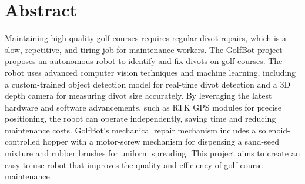 \chapter*{Abstract}
Maintaining high-quality golf courses requires regular divot repairs, which is a slow, repetitive, and tiring job for maintenance workers. The GolfBot project proposes an autonomous robot to identify and fix divots on golf courses. The robot uses advanced computer vision techniques and machine learning, including a custom-trained object detection model for real-time divot detection and a 3D depth camera for measuring divot size accurately. By leveraging the latest hardware and software advancements, such as RTK GPS modules for precise positioning, the robot can operate independently, saving time and reducing maintenance costs. GolfBot's mechanical repair mechanism includes a solenoid-controlled hopper with a motor-screw mechanism for dispensing a sand-seed mixture and rubber brushes for uniform spreading. This project aims to create an easy-to-use robot that improves the quality and efficiency of golf course maintenance.
